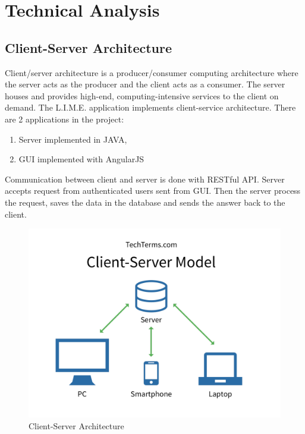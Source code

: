\documentclass[a4paper,11pt,twoside]{report}
\theoremstyle{definition}
\begin{document}


\chapter{Technical Analysis}


\section{Client-Server Architecture}
Client/server architecture is a producer/consumer computing architecture where the server acts as the producer and the client acts as a consumer. The server houses and provides high-end, computing-intensive services to the client on demand.
The L.I.M.E. application implements client-service architecture. There are 2 applications in the project:
\begin{enumerate}
\item Server implemented in JAVA,
\item GUI implemented with AngularJS
\end{enumerate}
Communication between client and server is done with RESTful API. Server accepts request from authenticated users sent from GUI. Then the server process the request, saves the data in the database and sends the answer back to the client.


\begin{figure}[h]

\begin{center}

\includegraphics[scale = 0.5]{CS}

\end{center}
\caption{Client-Server Architecture}
\end{figure}
\end{document}
